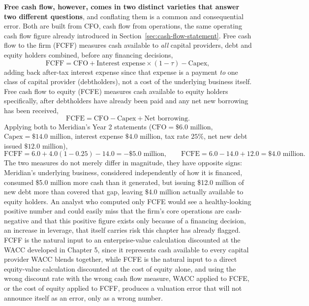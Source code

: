 \documentclass[../ai_in_finance]{subfiles}
\begin{document}
\textbf{Free cash flow, however, comes in two distinct varieties that answer two different questions}, and conflating them is a common and consequential error. Both are built from CFO, cash flow from operations, the same operating cash flow figure already introduced in Section~\ref{sec:cash-flow-statement}. Free cash flow to the firm (FCFF) measures cash available to \emph{all} capital providers, debt and equity holders combined, before any financing decisions,
\begin{equation*}
\text{FCFF} = \text{CFO} + \text{Interest expense} \times (1 - \tau) - \text{Capex},
\end{equation*}
adding back after-tax interest expense since that expense is a payment \emph{to} one class of capital provider (debtholders), not a cost of the underlying business itself. Free cash flow to equity (FCFE) measures cash available to equity holders specifically, after debtholders have already been paid and any net new borrowing has been received,
\begin{equation*}
\text{FCFE} = \text{CFO} - \text{Capex} + \text{Net borrowing}.
\end{equation*}
Applying both to Meridian's Year 2 statements ($\text{CFO}=\$6.0$ million, $\text{Capex}=\$14.0$ million, interest expense $\$4.0$ million, tax rate $25\%$, net new debt issued $\$12.0$ million),
\begin{equation*}
\text{FCFF} = 6.0 + 4.0(1-0.25) - 14.0 = -\$5.0 \text{ million}, \qquad \text{FCFE} = 6.0 - 14.0 + 12.0 = \$4.0 \text{ million}.
\end{equation*}
The two measures do not merely differ in magnitude, they have opposite signs: Meridian's underlying business, considered independently of how it is financed, consumed \$5.0 million more cash than it generated, but issuing \$12.0 million of new debt more than covered that gap, leaving \$4.0 million actually available to equity holders. An analyst who computed only FCFE would see a healthy-looking positive number and could easily miss that the firm's core operations are cash-negative and that this positive figure exists only because of a financing decision, an increase in leverage, that itself carries risk this chapter has already flagged.
FCFF is the natural input to an enterprise-value calculation discounted at the WACC developed in Chapter 5, since it represents cash available to every capital provider WACC blends together, while FCFE is the natural input to a direct equity-value calculation discounted at the cost of equity alone, and using the wrong discount rate with the wrong cash flow measure, WACC applied to FCFE, or the cost of equity applied to FCFF, produces a valuation error that will not announce itself as an error, only as a wrong number.
\end{document}
